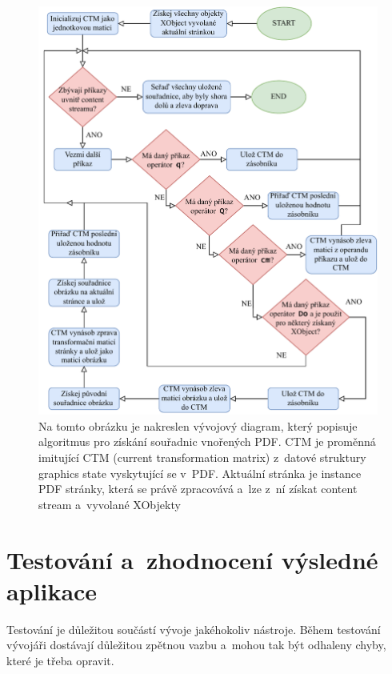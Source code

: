 \begin{figure}[H]
    \centering
    \includegraphics[width=\linewidth]{obrazky-figures/embedded_pdf_flow_chart.pdf}
    \caption{
        Na tomto obrázku je nakreslen vývojový diagram, který popisuje
        algoritmus pro získání souřadnic vnořených PDF. CTM je proměnná imitující 
        CTM (current transformation matrix) z~datové struktury graphics state
        vyskytující se v~PDF. Aktuální stránka je instance PDF stránky, která
        se právě zpracovává a~lze z~ní získat content stream a~vyvolané XObjekty
    }
    \label{pic_embedded_pdf_flow_chart}
\end{figure}






\chapter{Testování a~zhodnocení výsledné aplikace} \label{testing}
Testování je důležitou součástí vývoje jakéhokoliv nástroje. Během testování
vývojáři dostávají důležitou zpětnou vazbu a~mohou tak být odhaleny chyby,
které je třeba opravit.

